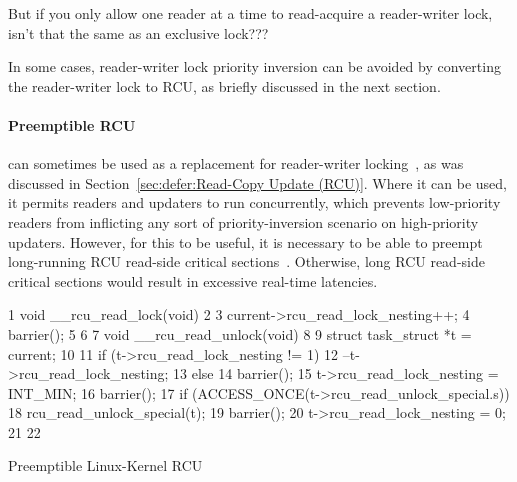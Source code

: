 \QuickQuiz{}
	But if you only allow one reader at a time to read-acquire
	a reader-writer lock, isn't that the same as an exclusive
	lock???
 \QuickQuizEnd

In some cases, reader-writer lock priority inversion can be avoided by
converting the reader-writer lock to RCU, as briefly discussed in the
next section.

\paragraph{Preemptible RCU}
can sometimes be used as a replacement for reader-writer
locking~\cite{PaulEMcKenney2007WhatIsRCUFundamentally,PaulMcKenney2012RCUUsage,PaulEMcKenney2014RCUAPI},
as was discussed in Section~\ref{sec:defer:Read-Copy Update (RCU)}.
Where it can be used, it permits readers and updaters to run concurrently,
which prevents low-priority readers from inflicting any sort of
priority-inversion scenario on high-priority updaters.
However, for this to be useful, it is necessary to be able to preempt
long-running RCU read-side critical
sections~\cite{DinakarGuniguntala2008IBMSysJ}.
Otherwise, long RCU read-side critical sections would result in
excessive real-time latencies.

\begin{listing}[tb]
{ \scriptsize
\begin{verbbox}
 1 void __rcu_read_lock(void)
 2 {
 3   current->rcu_read_lock_nesting++;
 4   barrier();
 5 }
 6 
 7 void __rcu_read_unlock(void)
 8 {
 9   struct task_struct *t = current;
10 
11   if (t->rcu_read_lock_nesting != 1) {
12     --t->rcu_read_lock_nesting;
13   } else {
14     barrier();
15     t->rcu_read_lock_nesting = INT_MIN;
16     barrier();
17     if (ACCESS_ONCE(t->rcu_read_unlock_special.s))
18       rcu_read_unlock_special(t);
19     barrier();
20     t->rcu_read_lock_nesting = 0;
21   }
22 }
\end{verbbox}
}
\centering
\theverbbox
\caption{Preemptible Linux-Kernel RCU}
\label{lst:advsync:Preemptible Linux-Kernel RCU}
\end{listing}

